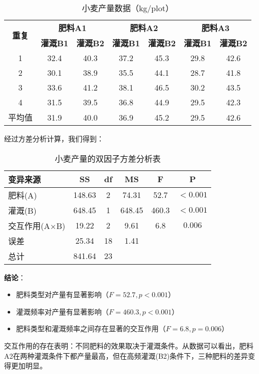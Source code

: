 \documentclass[12pt, a4paper]{amsart}
\begin{document}
\begin{table}[h!]
\centering
\caption{小麦产量数据（kg/plot）}
\begin{tabular}{c|cc|cc|cc}
\toprule
\multirow{2}{*}{\textbf{重复}} & \multicolumn{2}{c|}{\textbf{肥料A1}} & \multicolumn{2}{c|}{\textbf{肥料A2}} & \multicolumn{2}{c}{\textbf{肥料A3}} \\
& \textbf{灌溉B1} & \textbf{灌溉B2} & \textbf{灌溉B1} & \textbf{灌溉B2} & \textbf{灌溉B1} & \textbf{灌溉B2} \\
\midrule
1 & 32.4 & 40.3 & 37.2 & 45.3 & 29.8 & 42.6 \\
2 & 30.1 & 38.9 & 35.5 & 44.1 & 28.7 & 41.8 \\
3 & 33.6 & 41.2 & 38.1 & 46.5 & 30.2 & 43.5 \\
4 & 31.5 & 39.5 & 36.8 & 44.9 & 29.5 & 42.3 \\
\midrule
平均值 & 31.9 & 40.0 & 36.9 & 45.2 & 29.5 & 42.6 \\
\bottomrule
\end{tabular}
\end{table}

经过方差分析计算，我们得到：

\begin{table}[h!]
\centering
\caption{小麦产量的双因子方差分析表}
\begin{tabular}{lccccc}
\toprule
\textbf{变异来源} & \textbf{SS} & \textbf{df} & \textbf{MS} & \textbf{F} & \textbf{P} \\
\midrule
肥料(A) & 148.63 & 2 & 74.31 & 52.7 & $<0.001$ \\
灌溉(B) & 648.45 & 1 & 648.45 & 460.3 & $<0.001$ \\
交互作用(A×B) & 19.22 & 2 & 9.61 & 6.8 & $0.006$ \\
误差 & 25.34 & 18 & 1.41 & & \\
\midrule
总计 & 841.64 & 23 & & & \\
\bottomrule
\end{tabular}
\end{table}

\textbf{结论}：
\begin{itemize}
    \item 肥料类型对产量有显著影响（$F=52.7, p<0.001$）
    \item 灌溉频率对产量有显著影响（$F=460.3, p<0.001$）
    \item 肥料类型和灌溉频率之间存在显著的交互作用（$F=6.8, p=0.006$）
\end{itemize}

交互作用的存在表明：不同肥料的效果取决于灌溉条件。从数据可以看出，肥料A2在两种灌溉条件下都产量最高，但在高频灌溉(B2)条件下，三种肥料的差异变得更加明显。
\end{document}
